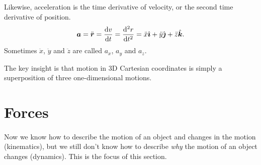 \documentclass[../classical_mechanics.tex]{subfiles}
\begin{document}
        \begin{definition}
            Likewise, acceleration is the time derivative of velocity, or the second time derivative of position.
            \begin{equation}
                \vec{a}=\ddot{\vec{r}}=\dv{v}{t}=\dv[2]{r}{t}=\ddot{x}\ihat+\ddot{y}\jhat+\ddot{z}\khat.
            \end{equation}
            Sometimes $\ddot{x}$, $\ddot{y}$ and $\ddot{z}$ are called $a_x$, $a_y$ and $a_z$.
        \end{definition}
        The key insight is that motion in 3D Cartesian coordinates is simply a superposition of three one-dimensional motions.
        
    \section{Forces}
        \paragraph{}
        Now we know how to describe the motion of an object and changes in the motion (kinematics), but we still don't know how to describe \textit{why} the motion of an object changes (dynamics).
        This is the focus of this section.
\end{document}
